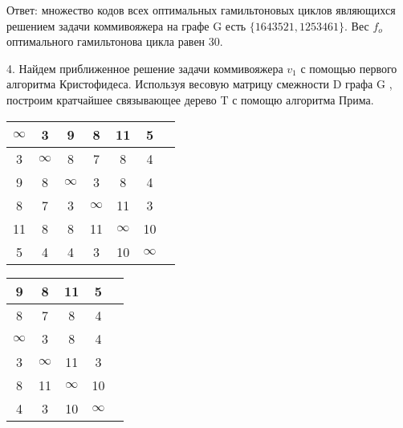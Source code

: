 \documentclass[a4paper,10pt]{article} %
\begin{document}
\bigskip

{\large
Ответ: множество кодов всех оптимальных гамильтоновых циклов являющихся решением задачи коммивояжера на графе G есть $\{1643521, 1253461 \}$. Вес $f_o$ оптимального гамильтонова цикла равен 30.
}

\newpage


4. \quad Найдем приближенное решение задачи коммивояжера $v_1$ с помощью первого алгоритма Кристофидеса. Используя весовую матрицу смежности D графа G , построим кратчайшее связывающее дерево T с помощю алгоритма Прима.

\medskip



\begin{tabular}[]{|c|c|c|c|c|c|c|}
\hline
$\infty$ &    \cellcolor{yellow}3 &    9 &    8 &   11 &    5 \\
\hline
  3 &  $\infty$ &    8 &    7 &    8 &    4 \\
\hline
  9 &    8 &  $\infty$ &    3 &    8 &    4 \\
\hline
  8 &    7 &    3 &  $\infty$ &   11 &    3 \\
\hline
 11 &    8 &    8 &   11 &  $\infty$ &   10 \\
\hline
  5 &    4 &    4 &    3 &   10 &  $\infty$ \\
\hline
\end{tabular}
\hspace{4cm}
\begin{tabular}[]{|c|c|c|c|c|}
\hline
\rowcolor{goodrow}     9 &    8 &   11 &    5 \\
\hline
 \rowcolor{goodrow}     8 &    7 &    8 &    \cellcolor{yellow}4 \\
\hline
  $\infty$ &    3 &    8 &    4 \\
\hline
    3 &  $\infty$ &   11 &    3 \\
\hline
    8 &   11 &  $\infty$ &   10 \\
\hline
    4 &    3 &   10 &  $\infty$ \\
\hline
\end{tabular}

\medskip
\end{document}
